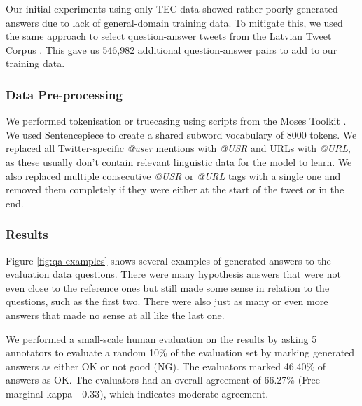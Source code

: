 \documentclass{IOS-Book-Article}
\begin{document}
Our initial experiments using only TEC data showed rather poorly generated answers due to lack of general-domain training data. To mitigate this, we used the same approach to select question-answer tweets from the Latvian Tweet Corpus \cite{pinnis2018latvian}. This gave us 546,982 additional question-answer pairs to add to our training data.

\subsubsection{Data Pre-processing}
We performed tokenisation or truecasing using scripts from the Moses Toolkit \cite{Koehn2007Moses:Translation}. We used Sentencepiece \cite{kudo2018sentencepiece} to create a shared subword vocabulary of 8000 tokens. We replaced all Twitter-specific \textit{@user} mentions with \textit{@USR} and URLs with \textit{@URL}, as these usually don't contain relevant linguistic data for the model to learn. We also replaced multiple consecutive \textit{@USR} or \textit{@URL} tags with a single one and removed them completely if they were either at the start of the tweet or in the end.

\subsubsection{Results}

Figure \ref{fig:qa-examples} shows several examples of generated answers to the evaluation data questions. There were many hypothesis answers that were not even close to the reference ones but still made some sense in relation to the questions, such as the first two. There were also just as many or even more answers that made no sense at all like the last one.

We performed a small-scale human evaluation on the results by asking 5 annotators to evaluate a random 10\% of the evaluation set by marking generated answers as either OK or not good (NG). The evaluators marked 46.40\% of answers as OK. The evaluators had an overall agreement of 66.27\% (Free-marginal kappa \cite{randolph2005free} - 0.33), which indicates moderate agreement.
\end{document}
